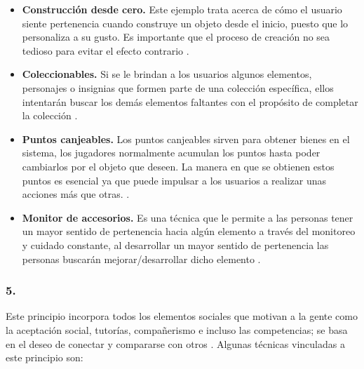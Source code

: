     \begin{itemize}
    \item
    {\bf Construcción desde cero.}
        Este ejemplo trata acerca de cómo el usuario siente pertenencia cuando
        construye un objeto desde el inicio, puesto que lo personaliza a su gusto.
        Es importante que el proceso de creación no sea tedioso para evitar el
        efecto contrario \cite[p. 182]{Octalysis}.

    \item
    {\bf Coleccionables.}
        Si se le brindan a los usuarios algunos elementos, personajes o insignias que
        formen parte de una colección específica, ellos intentarán buscar los demás
        elementos faltantes con el propósito de completar la colección
        \cite[p. 183]{Octalysis}.

    \item
    {\bf Puntos canjeables.}
        Los puntos canjeables sirven para obtener bienes en el sistema, los jugadores
        normalmente acumulan los puntos hasta poder cambiarlos por el objeto que
        deseen. La manera en que se obtienen estos puntos es esencial ya que puede
        impulsar a los usuarios a realizar unas acciones más que otras.
        \cite[p. 187]{Octalysis}.

    \item
    {\bf Monitor de accesorios.}
        Es una técnica que le permite a las personas tener un mayor sentido de pertenencia
        hacia algún elemento a través del monitoreo y cuidado constante, al desarrollar un
        mayor sentido de pertenencia las personas buscarán mejorar/desarrollar dicho elemento
        \cite[p. 189]{Octalysis}.

    \end{itemize}

\subsubsection{5. \principioV} \label{subsec:principioV}

 Este principio incorpora todos los elementos sociales que motivan a la gente como la
 aceptación social, tutorías, compañerismo e incluso las competencias; se basa en el
 deseo de conectar y compararse con otros \cite[pp. 27, 197]{Octalysis}. Algunas
 técnicas vinculadas a este principio son:

